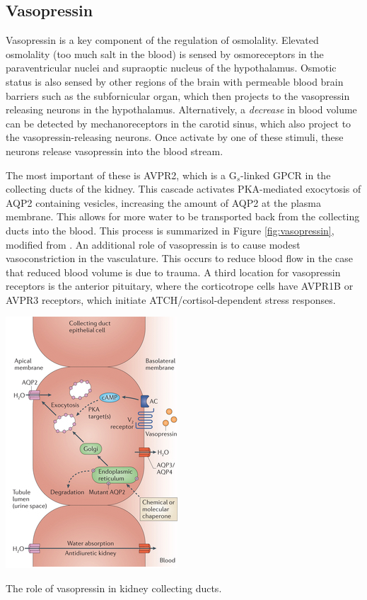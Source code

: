 \documentclass{tufte-handout}
\begin{document}
\subsection{Vasopressin}

Vasopressin is a key component of the regulation of osmolality.  Elevated osmolality (too much salt in the blood) is sensed by osmoreceptors in the  paraventricular nuclei  and supraoptic nucleus of the hypothalamus.  Osmotic status is also sensed by other regions of the brain with permeable blood brain barriers such as the subfornicular organ, which then projects to the vasopressin releasing neurons in the hypothalamus.  Alternatively, a \emph{decrease} in blood volume can be detected by mechanoreceptors in the carotid sinus, which also project to the vasopressin-releasing neurons.  Once activate by one of these stimuli, these neurons release vasopressin into the blood stream.

 The most important of these is AVPR2, which is a G$_s$-linked GPCR in the collecting ducts of the kidney.  This cascade activates PKA-mediated exocytosis of AQP2 containing vesicles, increasing the amount of AQP2 at the plasma membrane.  This allows for more water to be transported back from the collecting ducts into the blood.  This process is summarized in Figure \ref{fig:vasopressin}, modified from \cite{Verkman2014}.  An additional role of vasopressin is to cause modest vasoconstriction in the vasculature.  This occurs to reduce blood flow in the case that reduced blood volume is due to trauma.  A third location for vasopressin receptors is the anterior pituitary, where the corticotrope cells have AVPR1B or AVPR3 receptors, which initiate  ATCH/cortisol-dependent stress responses.

\begin{marginfigure}
  \includegraphics{figures/vasopressin}
  \caption{The role of vasopressin in kidney collecting ducts.}
    \label{fig:vasopressin}
\end{marginfigure}
\end{document}
